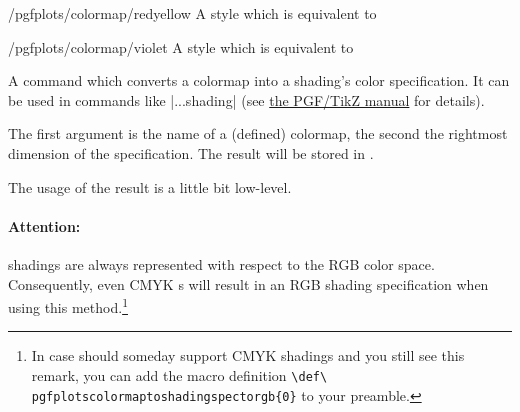 \begin{stylekey}{/pgfplots/colormap/redyellow}
    A style which is equivalent to
\begin{codeexample}
\end{codeexample}

\end{stylekey}

\begin{stylekey}{/pgfplots/colormap/violet}
    A style which is equivalent to
\begin{codeexample}
\end{codeexample}

\end{stylekey}

\begin{command}{\pgfplotscolormaptoshadingspec{}}
    A command which converts a colormap into a \PGF{} shading's color
    specification. It can be used in commands like |\pgfdeclare...shading| (see
    \href{https://tikz.dev/}{the PGF/TikZ manual} for details).

    The first argument is the name of a (defined) colormap, the second the
    rightmost dimension of the specification. The result will be stored in
    .
\begin{codeexample}[]
    \result
    \def\tempb{\pgfdeclarehorizontalshading{tempshading}{1cm}}%
    \expandafter\tempb\expandafter{\result}%
\end{codeexample}
    The usage of the result  is a little bit
    low-level.


    \paragraph{Attention:}

    \PGF{} shadings are always represented with respect to the RGB color space.
    Consequently, even CMYK s will result in an RGB shading
    specification when using this method.\footnote{In case \PGF{} should someday
    support CMYK shadings and you still see this remark, you can add the macro
    definition \texttt{\textbackslash def\textbackslash
    pgfplotscolormaptoshadingspectorgb\{0\}} to your preamble.}
\end{command}

